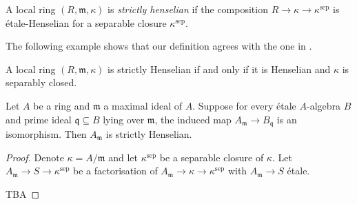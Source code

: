 
\begin{definition}
    \label{def:strictly-henselian-local-ring}
    A local ring $(R, \mathfrak{m}, \kappa)$ is \emph{strictly henselian} if the composition $R \to \kappa \to \kappa^{\mathrm{sep}}$ is étale-Henselian
    for a separable closure $\kappa^{\mathrm{sep}}$.
\end{definition}

The following example shows that our definition agrees with the one in
\cite[\href{https://stacks.math.columbia.edu/tag/04GF}{Tag 04GF}]{stacks-project}.

\begin{example}
    A local ring $(R, \mathfrak{m}, \kappa)$ is strictly Henselian if and only if it is Henselian and $\kappa$ is separably closed.
\end{example}

\begin{lemma}
    Let $A$ be a ring and $\mathfrak{m}$ a maximal ideal of $A$. Suppose for every étale $A$-algebra $B$ and
    prime ideal $\mathfrak{q} \subseteq B$ lying over $\mathfrak{m}$, the induced map
    $A_{\mathfrak{m}} \to B_{\mathfrak{q}}$ is an isomorphism.
    Then $A_{\mathfrak{m}}$ is strictly Henselian.
    \label{lemma:localization-strictly-Henselian}
\end{lemma}

\begin{proof}
    Denote $\kappa = A / \mathfrak{m}$ and let $\kappa^{\mathrm{sep}}$ be a separable closure of $\kappa$.
    Let $A_{\mathfrak{m}} \to S \to \kappa^{\mathrm{sep}}$ be a factorisation of $A_{\mathfrak{m}} \to \kappa \to \kappa^{\mathrm{sep}}$
    with $A_{\mathfrak{m}} \to S$ étale.

    TBA
\end{proof}



